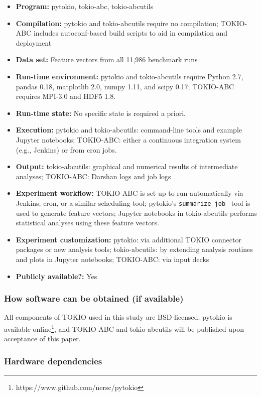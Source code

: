 {\small
\begin{itemize}
  \item {\bf Program: } pytokio, tokio-abc, tokio-abcutils
  \item {\bf Compilation: } pytokio and tokio-abcutils require no compilation; TOKIO-ABC includes autoconf-based build scripts to aid in compilation and deployment
  \item {\bf Data set: } Feature vectors from all 11,986 benchmark runs
  \item {\bf Run-time environment: } pytokio and tokio-abcutils require Python 2.7, pandas 0.18, matplotlib 2.0, numpy 1.11, and scipy 0.17; TOKIO-ABC requires MPI-3.0 and HDF5 1.8.
  \item {\bf Run-time state: } No specific state is required a priori.
  \item {\bf Execution: } pytokio and tokio-abcutils: command-line tools and example Jupyter notebooks; TOKIO-ABC: either a continuous integration system (e.g., Jenkins) or from cron jobs.
  \item {\bf Output: } tokio-abcutils: graphical and numerical results of intermediate analyses; TOKIO-ABC: Darshan logs and job logs
  \item {\bf Experiment workflow: } TOKIO-ABC is set up to run automatically via Jenkins, cron, or a similar scheduling tool; pytokio's \texttt{summarize\_job}~\cite{Lockwood2018tokio} tool is used to generate feature vectors; Jupyter notebooks in tokio-abcutils performs statistical analyses using these feature vectors.
  \item {\bf Experiment customization: } pytokio: via additional TOKIO connector packages or new analysis tools; tokio-abcutils: by extending analysis routines and plots in Jupyter notebooks; TOKIO-ABC: via input decks
  \item {\bf Publicly available?: } Yes
\end{itemize}
}

\subsubsection{How software can be obtained (if available)}

All components of TOKIO used in this study are BSD-licensed.
pytokio is available online\footnote{https://www.github.com/nersc/pytokio}, and TOKIO-ABC and tokio-abcutils will be published upon acceptance of this paper.

\subsubsection{Hardware dependencies}


